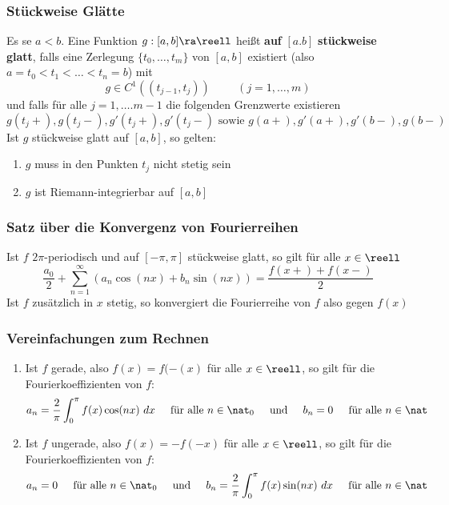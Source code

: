 \documentclass{kit}
\begin{document}
    \subsubsection{Stückweise Glätte}
      Es se $a<b$. Eine Funktion $g:[a,b]\ra\reell$ heißt \textbf{auf} $[a.b]$ \textbf{stückweise glatt}, falls eine
      Zerlegung $\{t_0,\dots,t_m\}$ von $[a,b]$ existiert (also $a=t_0<t_1<\dots<t_n=b$) mit
      $$g\in C^1((t_{j-1},t_j))\hspace{1cm}(j=1,\dots,m)$$
      und falls für alle $j=1,\dots.m-1$ die folgenden Grenzwerte existieren
      $$g(t_j+),g(t_j-),g'(t_j+),g'(t_j-)\text{ sowie }g(a+),g'(a+),g'(b-),g(b-)$$
      Ist $g$ stückweise glatt auf $[a,b]$, so gelten:\begin{enumerate}
        \item $g$ muss in den Punkten $t_j$ nicht stetig sein
        \item $g$ ist Riemann-integrierbar auf $[a,b]$
      \end{enumerate}
    \subsubsection{Satz über die Konvergenz von Fourierreihen}
      Ist $f$ $2\pi$-periodisch und auf $[-\pi,\pi]$ stückweise glatt, so gilt für alle $x\in\reell$
      $$\frac{a_0}{2}+\sum^\infty_{n=1}(a_n\cos(nx)+b_n\sin(nx))=\frac{f(x+)+f(x-)}{2}$$
      Ist $f$ zusätzlich in $x$ stetig, so konvergiert die Fourierreihe von $f$ also gegen $f(x)$
    \subsubsection{Vereinfachungen zum Rechnen}
      \begin{enumerate}
        \item Ist $f$ gerade, also $f(x)=f(-(x)$ für alle $x\in\reell$, so gilt für die Fourierkoeffizienten von $f$:
          $$a_n=\frac{2}{\pi}\int^\pi_0f(x)\cos(nx)\ dx\hspace{0.5cm}\text{für alle }n\in\nat_0\hspace{0.5cm}\text{und}
          \hspace{0.5cm} b_n=0\hspace{0.5cm}\text{für alle }n\in\nat$$
        \item Ist $f$ ungerade, also $f(x)=-f(-x)$ für alle $x\in\reell$, so gilt für die Fourierkoeffizienten von $f$:
          $$a_n=0\hspace{0.5cm}\text{für alle }n\in\nat_0\hspace{0.5cm}\text{und}
          \hspace{0.5cm} b_n=\frac{2}{\pi}\int^\pi_0f(x)\sin(nx)\ dx \hspace{0.5cm}\text{für alle }n\in\nat$$
      \end{enumerate}
\end{document}
